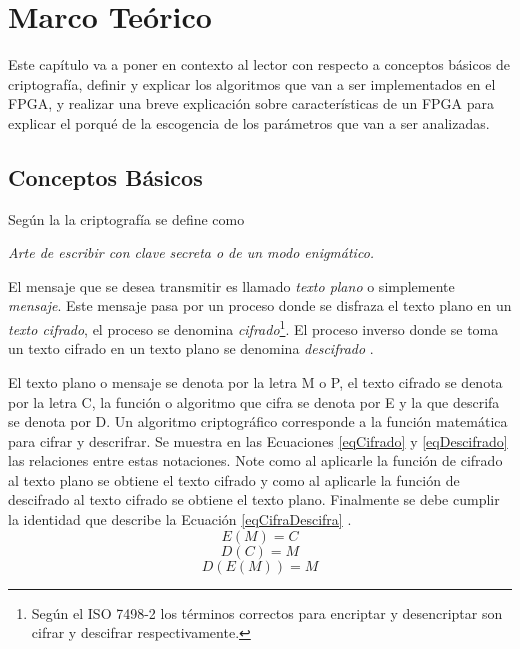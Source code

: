 \chapter{Marco Teórico}

Este capítulo va a poner en contexto al lector con respecto a conceptos básicos de criptografía, definir y explicar los algoritmos que van a ser implementados en el FPGA, y realizar una breve explicación sobre características de un FPGA para explicar el porqué de la escogencia de los parámetros que van a ser analizadas.

\section{Conceptos Básicos}
Según la \cite{raeCriptografia} la criptografía se define como
\begin{center}
    \begin{minipage}{0.9\linewidth}
        \vspace{5pt}%
        {\small
            \emph{Arte de escribir con clave secreta o de un modo enigmático.}
        }
 		\vspace{5pt}%
    \end{minipage}
\end{center}
El mensaje que se desea transmitir es llamado \textit{texto plano} o simplemente \textit{mensaje}. Este mensaje pasa por un proceso donde se disfraza el texto plano en un \textit{texto cifrado}, el proceso se denomina \textit{cifrado}\footnote{Según el ISO 7498-2 los términos correctos para encriptar y desencriptar son cifrar y descifrar respectivamente.}. El proceso inverso donde se toma un texto cifrado en un texto plano se denomina \textit{descifrado} \citep{bruce}. 

El texto plano o mensaje se denota por la letra M o P, el texto cifrado se denota por la letra C, la función o algoritmo que cifra se denota por E y la que descrifa se denota por D. Un algoritmo criptográfico corresponde a la función matemática para cifrar y descrifrar.
\newline
Se muestra en las Ecuaciones \eqref{eqCifrado} y \eqref{eqDescifrado} las relaciones entre estas notaciones. Note como al aplicarle la función de cifrado al texto plano se obtiene el texto cifrado y como al aplicarle la función de descifrado al texto cifrado se obtiene el texto plano. Finalmente se debe cumplir la identidad que describe la Ecuación \eqref{eqCifraDescifra} \citep{bruce}.
\begin{equation} \label{eqCifrado}
E(M) = C
\end{equation}
\begin{equation} \label{eqDescifrado}
D(C) = M
\end{equation}
\begin{equation} \label{eqCifraDescifra}
D(E(M)) = M
\end{equation}


